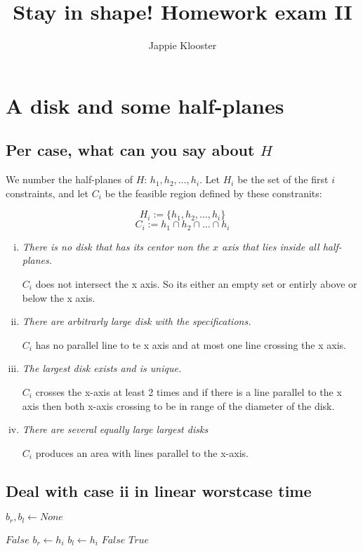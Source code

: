 \documentclass{article}
\begin{document}
\author{Jappie Klooster}
\title{Stay in shape! Homework exam II}
\maketitle
\section{A disk and some half-planes}
\subsection{Per case, what can you say about $H$}
We number the half-planes of $H$: $h_1, h_2,\dots,h_i$.
Let $H_{i}$ be the set of the first $i$ constraints, and
let $C_{i}$ be the feasible region defined by these constranits:

\[ H_i := \{h_1, h_2,\dots, h_i\}\]
\[ C_i := h_1 \cap h_2 \cap \dots \cap h_i\]

\begin{enumerate}[(i)]
	\item \emph{There is no disk that has its centor non the $x$ axis
			that lies inside all half-planes.}

		$C_i$ does not intersect the x axis. So its either an empty set or entirly above or below the x axis.

	\item \emph{There are arbitrarly large disk with the specifications.}

		$C_i$ has no parallel line  to te x axis and
		at most one line crossing the x axis.

	\item \emph{The largest disk exists and is unique.}

		$C_i$ crosses the x-axis at least 2 times and
		if there is a line parallel to the x axis then both x-axis crossing
		to be in range of the diameter of the disk.

	\item \emph{There are several equally large largest disks}

		$C_i$ produces an area with lines parallel to the x-axis.

\end{enumerate}

\newpage
\subsection{Deal with case ii in linear worstcase time}
\begin{algorithmic}[1]
		\State
		$b_r, b_l \gets None$

				\State
				\Return $False$
			\EndIf
			\State
			\State
				$b_r \gets h_i$
			\EndIf
			\State
				$b_l \gets h_i$
			\EndIf
				\State
				\Return $False$
			\EndIf
		\EndFor
		\State
		\Return $True$
	\EndFunction
\end{algorithmic}
\end{document}
